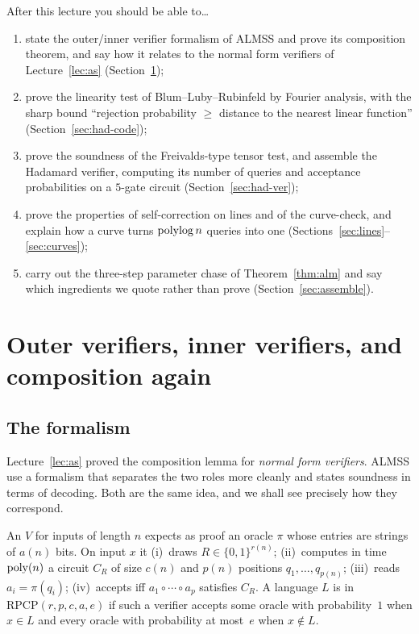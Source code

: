 \begin{goalbox}{After this lecture you should be able to\ldots}
\begin{enumerate}[leftmargin=*,label=(\arabic*)]
  \item state the outer/inner verifier formalism of ALMSS and prove its composition theorem, and say how it
        relates to the normal form verifiers of Lecture~\ref{lec:as} (Section~\ref{sec:outin});
  \item prove the linearity test of Blum--Luby--Rubinfeld by Fourier analysis, with the sharp bound
        ``rejection probability $\ge$ distance to the nearest linear function'' (Section~\ref{sec:had-code});
  \item prove the soundness of the Freivalds-type tensor test, and assemble the Hadamard verifier, computing its
        number of queries and acceptance probabilities on a $5$-gate circuit (Section~\ref{sec:had-ver});
  \item prove the properties of self-correction on lines and of the curve-check, and explain how a curve turns
        $\operatorname{polylog} n$ queries into one (Sections~\ref{sec:lines}--\ref{sec:curves});
  \item carry out the three-step parameter chase of Theorem~\ref{thm:alm} and say which ingredients we quote rather than prove (Section~\ref{sec:assemble}).
\end{enumerate}
\end{goalbox}


\section{Outer verifiers, inner verifiers, and composition again}
\label{sec:outin}

\subsection{The formalism}

Lecture~\ref{lec:as} proved the composition lemma for \emph{normal form verifiers}.  ALMSS use a formalism that
separates the two roles more cleanly and states soundness in terms of decoding.  Both are the same idea, and we shall see
precisely how they correspond.

\begin{definition}\label{def:outer}
An  $V$ for inputs of length $n$ expects as proof an oracle $\pi$ whose entries are strings
of $a(n)$ bits.  On input $x$ it (i)~draws $R\in\{0,1\}^{r(n)}$; (ii)~computes in time $\operatorname{poly}(n)$ a circuit $C_R$ of size $c(n)$ and
$p(n)$ positions $q_1,\dots,q_{p(n)}$; (iii)~reads $a_i=\pi(q_i)$; (iv)~accepts iff $a_1\circ\cdots\circ a_p$ satisfies $C_R$.
A language $L$ is in $\mathrm{RPCP}(r,p,c,a,e)$ if such a verifier accepts some oracle with probability~$1$ when $x\in L$ and every oracle with probability at
most~$e$ when $x\notin L$.
\end{definition}

